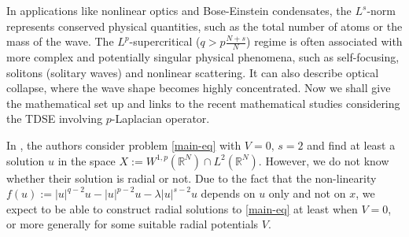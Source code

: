 \documentclass[11pt,reqno]{amsart}
\theoremstyle{definition}
\numberwithin{equation}{section}
\numberwithin{theorem}{section}
\numberwithin{equation}{section}
\numberwithin{theorem}{section}
\newcommand{\R}{\mathbb{R}}
\begin{document}
In applications like nonlinear optics and Bose-Einstein condensates, the $L^s$-norm represents conserved physical quantities, such as the total number of atoms or the mass of the wave. The $L^p$-supercritical ($q>p\frac{N+s}{N}$) regime is often associated with more complex and potentially singular physical phenomena, such as self-focusing, solitons (solitary waves) and nonlinear scattering. It can also describe optical collapse, where the wave shape becomes highly concentrated. Now we shall give the mathematical set up and links to the recent mathematical studies considering the TDSE involving $p$-Laplacian operator.

In \cite{WLZL}, the authors consider problem \eqref{main-eq} with $V=0,\, s=2$ and find at least a solution $u$ in the space $X:= W^{1,p}(\R^N)\cap L^2(\R^N)$. However, we do not know whether their solution is radial or not. Due to the fact that the non-linearity $f(u):=|u|^{q-2}u-|u|^{p-2}u-\lambda |u|^{s-2}u$ depends on $u$ only and not on $x$, we expect to be able to construct radial solutions to \eqref{main-eq} at least when $V=0$, or more generally for some suitable radial potentials $V$.\\
\end{document}
